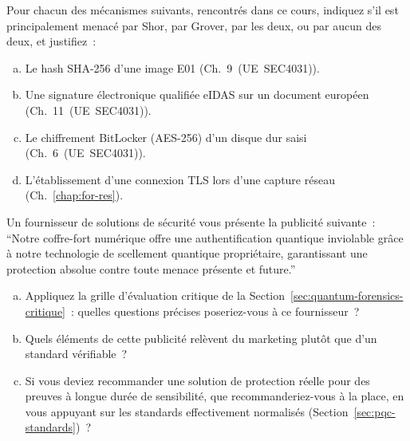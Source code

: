 \bigskip

\begin{boxexo}[title={\ding{45}\quad Exercice~26.1. Distinguer les menaces \niveaubase}]
Pour chacun des mécanismes suivants, rencontrés dans ce cours,
indiquez s'il est principalement menacé par Shor, par Grover,
par les deux, ou par aucun des deux, et justifiez~:
\begin{enumerate}[(a)]
    \item Le hash SHA-256 d'une image E01 (Ch.~9~(UE~SEC4031)).
    \item Une signature électronique qualifiée eIDAS sur un
          document européen (Ch.~11~(UE~SEC4031)).
    \item Le chiffrement BitLocker (AES-256) d'un disque dur
          saisi (Ch.~6~(UE~SEC4031)).
    \item L'établissement d'une connexion TLS lors d'une capture
          réseau (Ch.~\ref{chap:for-res}).
\end{enumerate}
\end{boxexo}

\begin{boxexo}[title={\ding{45}\quad Exercice~26.2. Esprit critique appliqué \niveaumoyen}]
Un fournisseur de solutions de sécurité vous présente la publicité
suivante~: ``Notre coffre-fort numérique offre une authentification
quantique inviolable grâce à notre technologie de scellement
quantique propriétaire, garantissant une protection absolue
contre toute menace présente et future.''
\begin{enumerate}[(a)]
    \item Appliquez la grille d'évaluation critique de la
          Section~\ref{sec:quantum-forensics-critique}~: quelles
          questions précises poseriez-vous à ce fournisseur~?
    \item Quels éléments de cette publicité relèvent du marketing
          plutôt que d'un standard vérifiable~?
    \item Si vous deviez recommander une solution de protection
          réelle pour des preuves à longue durée de sensibilité,
          que recommanderiez-vous à la place, en vous appuyant
          sur les standards effectivement normalisés
          (Section~\ref{sec:pqc-standards})~?
\end{enumerate}
\end{boxexo}

